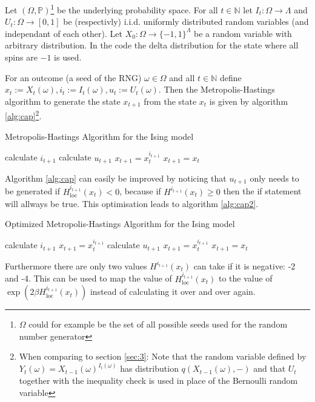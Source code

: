 \documentclass[a4paper]{article}
\begin{document}
Let $(\Omega, \mathbb{P})$\footnote{$\Omega$ could
for example be the set of all possible seeds used for the random number generator}
be the underlying probability space.
For all $t \in \mathbb{N}$ let $I_t : \Omega \to \Lambda$ and
$U_t : \Omega \to [0,1]$ be (respectivly) i.i.d. uniformly distributed random variables
(and independant of each other).
Let $X_0 : \Omega \to \{-1,1 \}^\Lambda$ be a random variable with arbitrary distribution.
In the code the delta distribution for the state where all spins are $-1$ is used.

For an outcome (a seed of the RNG) $\omega \in \Omega$
and all $t \in \mathbb{N}$ define $x_t := X_t (\omega),i_t := I_t(\omega), u_t := U_t(\omega)$.
Then the Metropolis-Hastings algorithm to generate the state $x_{t+1}$
from the state $x_t$ is given by algorithm \ref{alg:cap}\footnote{When comparing to section \ref{sec:3}: Note that the random variable defined by $Y_t (\omega)=  X_{t-1}(\omega)^{I_{t}(\omega)}$ has distribution $q(X_{t-1}(\omega),-)$ and that $U_t$ together with the inequality check is used in place of the Bernoulli random variable}.
\begin{algorithm}
    \caption{Metropolis-Hastings Algorithm for the Ising model}\label{alg:cap}
\begin{algorithmic}
    \State calculate $i_{t+1}$
    \State calculate $u_{t+1}$
        \State $x_{t+1} = x^{i_{t+1}}_{t}$
    \Else
    \State $x_{t+1} = x_{t}$
    \EndIf 
\end{algorithmic}
\end{algorithm}
Algorithm \ref{alg:cap} can easily be improved by noticing that $u_{t+1}$ only needs to
be generated if $H_{\mathrm{loc}}^{i_{t+1}}(x_t)< 0$,
because if $H^{i_{t+1}}(x_t) \geq 0$ then the if statement will allways be true.
This optimisation leads to algorithm \ref{alg:cap2}.
\begin{algorithm}
    \caption{Optimized Metropolis-Hastings Algorithm for the Ising model}\label{alg:cap2}
\begin{algorithmic}
    \State calculate $i_{t+1}$
        \State $x_{t+1} = x^{i_{t+1}}_{t}$
    \Else
    \State calculate $u_{t+1}$
            \State $x_{t+1} = x^{i_{t+1}}_{t}$
        \Else
            \State $x_{t+1} = x_{t}$
        \EndIf
    \EndIf 
\end{algorithmic}
\end{algorithm}
Furthermore there are only two values $H^{i_{t+1}}(x_t) $ can take if it is negative: -2 and -4.
This can be used to map the value of $H_{\mathrm{loc}}^{i_{t+1}}(x_t)$
to the value of $\exp (2 \beta  H_{\mathrm{loc}}^{i_{t+1}}(x_t))$ instead of calculating it
over and over again.
\end{document}
